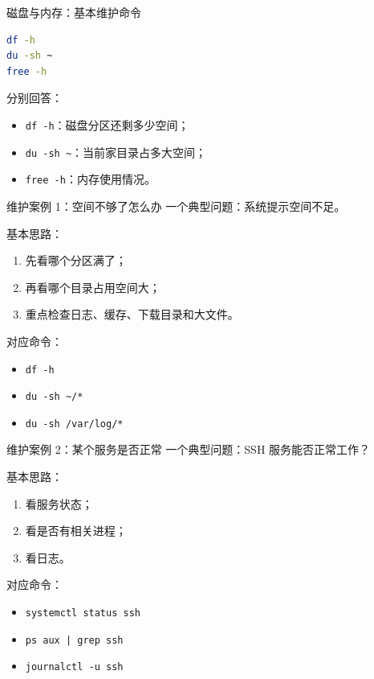 \documentclass[aspectratio=169]{beamer}
\begin{document}
\begin{frame}[fragile]{磁盘与内存：基本维护命令}
\begin{lstlisting}[language=bash]
df -h
du -sh ~
free -h
\end{lstlisting}

\vspace{0.5em}
分别回答：
\begin{itemize}
  \item \texttt{df -h}：磁盘分区还剩多少空间；
  \item \texttt{du -sh \textasciitilde}：当前家目录占多大空间；
  \item \texttt{free -h}：内存使用情况。
\end{itemize}
\end{frame}

\begin{frame}{维护案例 1：空间不够了怎么办}
一个典型问题：系统提示空间不足。

\vspace{0.5em}
基本思路：
\begin{enumerate}
  \item 先看哪个分区满了；
  \item 再看哪个目录占用空间大；
  \item 重点检查日志、缓存、下载目录和大文件。
\end{enumerate}

\vspace{0.5em}
对应命令：
\begin{itemize}
  \item \texttt{df -h}
  \item \texttt{du -sh \textasciitilde/*}
  \item \texttt{du -sh /var/log/*}
\end{itemize}
\end{frame}

\begin{frame}{维护案例 2：某个服务是否正常}
一个典型问题：SSH 服务能否正常工作？

\vspace{0.5em}
基本思路：
\begin{enumerate}
  \item 看服务状态；
  \item 看是否有相关进程；
  \item 看日志。
\end{enumerate}

\vspace{0.5em}
对应命令：
\begin{itemize}
  \item \texttt{systemctl status ssh}
  \item \texttt{ps aux | grep ssh}
  \item \texttt{journalctl -u ssh}
\end{itemize}
\end{frame}
\end{document}
